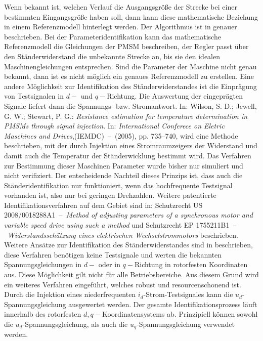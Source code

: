\documentclass[conference,twocolumn]{IEEEtran}
\begin{document}
Wenn bekannt ist, welchen Verlauf die Ausgangsgröße der Strecke bei einer bestimmten Eingangsgröße haben soll, dann kann diese mathematische Beziehung in einem Referenzmodell hinterlegt werden.
Der Algorithmus ist in \autocite{slotine_applied_1991} genauer beschrieben.
Bei der Parameteridentifikation kann das mathematische Referenzmodell die Gleichungen der PMSM beschreiben, der Regler passt über den Ständerwiderstand die unbekannte Strecke an, bis sie den idealen Maschinengleichungen entsprechen.
Sind die Parameter der Maschine nicht genau bekannt, dann ist es nicht möglich ein genaues Referenzmodell zu erstellen.
Eine andere Möglichkeit zur Identifikation des Ständerwiderstandes ist die Einprägung von Testsignalen in $d-$ und $q-$Richtung.
Die Auswertung der eingeprägten Signale liefert dann die Spannungs- bzw. Stromantwort.
In: Wilson, S. D.; Jewell, G. W.; Stewart, P. G.: \emph{Resistance estimation for temperature determination in PMSMs through signal injection}. In: \emph{International Conferece on Eletric Maschines and Drives},(IEMDC)~--~(2005), pp. 735--740, wird eine Methode beschrieben, mit der durch Injektion eines Stromraumzeigers der Widerstand und damit auch die Temperatur der Ständerwicklung bestimmt wird.
Das Verfahren zur Bestimmung dieser Maschinen Parameter wurde bisher nur simuliert und nicht verifiziert.
Der entscheidende Nachteil dieses Prinzips ist, dass auch die Ständeridentifikation nur funktioniert, wenn das hochfrequente Testsignal vorhanden ist, also nur bei geringen Drehzahlen.
Weitere patentierte Identifikationsverfahren auf dem Gebiet sind in: Schutzrecht US 2008/0018288A1~--~\emph{Method of adjusting parameters
of a synchronous motor and variable speed drive using such a method} und Schutzrecht EP 1755211B1~--~\emph{Widerstandsschätzung eines elektrischen
Wechselstrommotors} beschrieben.
Weitere Ansätze zur Identifikation des Ständerwiderstandes sind in \textcite{Kellner2012} beschrieben, diese Verfahren benötigen keine Testsignale und werten die bekannten Spannungsgleichungen in $d-$ oder in $q-$Richtung in rotorfesten Koordinaten aus.
Diese Möglichkeit gilt nicht für alle Betriebsbereiche. 
Aus diesem Grund wird ein weiteres Verfahren eingeführt, welches robust und resourcenschonend ist.
Durch die Injektion eines niederfrequenten $i_d$-Strom-Testsignales kann die $u_d$-Spannungsgleichung ausgewertet werden.
Der gesamte Identifikationsprozess läuft innerhalb des rotorfesten $d, q-$Koordinatensystems ab.
Prinzipiell können sowohl die $u_d$-Spannungsgleichung, als auch die $u_q$-Spannungsgleichung verwendet werden.
\end{document}
